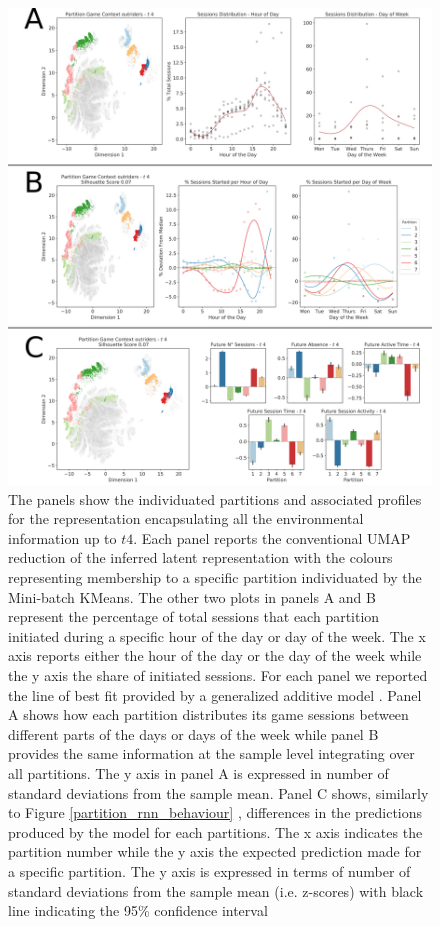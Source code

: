 \begin{figure}[!htb]
\includegraphics[width=\textwidth]{images/chapter_4/clust_env.png}
\centering
\caption[\textbf{Partitions of the representations generated by the RNN architectures using the environmental metrics}]{The panels show the individuated partitions and associated profiles for the representation encapsulating all the environmental information up to $t4$. Each panel reports the conventional UMAP reduction of the inferred latent representation with the colours representing membership to a specific partition individuated by the Mini-batch KMeans. The other two plots in panels A and B represent the percentage of total sessions that each partition initiated during a specific hour of the day or day of the week. The x axis reports either the hour of the day or the day of the week while the y axis the share of initiated sessions. For each panel we reported the line of best fit provided by a generalized additive model \cite{serven2018}. Panel A shows how each partition distributes its game sessions between different parts of the days or days of the week while panel B provides the same information at the sample level integrating over all partitions. The y axis in panel A is expressed in number of standard deviations from the sample mean. Panel C shows, similarly to Figure \ref{partition_rnn_behaviour} , differences in the predictions produced by the model for each partitions. The x axis indicates the partition number while the y axis the expected prediction made for a specific partition. The y axis is expressed in terms of number of standard deviations from the sample mean (i.e. z-scores) with black line indicating the 95\% confidence interval}
\label{partition_rnn_env} 
\end{figure}

